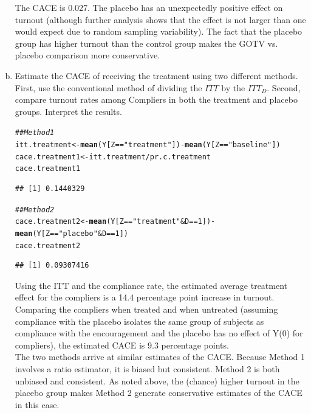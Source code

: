 \documentclass[11pt,notitlepage]{article}\usepackage[]{graphicx}\usepackage[]{color}
\makeatletter
\newcommand{\hlnum}[1]{\textcolor[rgb]{0.686,0.059,0.569}{#1}}%
\newcommand{\hlstr}[1]{\textcolor[rgb]{0.192,0.494,0.8}{#1}}%
\newcommand{\hlcom}[1]{\textcolor[rgb]{0.678,0.584,0.686}{\textit{#1}}}%
\newcommand{\hlopt}[1]{\textcolor[rgb]{0,0,0}{#1}}%
\newcommand{\hlstd}[1]{\textcolor[rgb]{0.345,0.345,0.345}{#1}}%
\newcommand{\hlkwb}[1]{\textcolor[rgb]{0.69,0.353,0.396}{#1}}%
\newcommand{\hlkwd}[1]{\textcolor[rgb]{0.737,0.353,0.396}{\textbf{#1}}}%
\newenvironment{kframe}{%
 \def\at@end@of@kframe{}%
 \ifinner\ifhmode%
  \def\at@end@of@kframe{\end{minipage}}%
  \begin{minipage}{\columnwidth}%
 \fi\fi%
 \def\FrameCommand##1{\hskip\@totalleftmargin \hskip-\fboxsep
 \colorbox{shadecolor}{##1}\hskip-\fboxsep
     \hskip-\linewidth \hskip-\@totalleftmargin \hskip\columnwidth}%
 \MakeFramed {\advance\hsize-\width
   \@totalleftmargin\z@ \linewidth\hsize
   \@setminipage}}%
 {\par\unskip\endMakeFramed%
 \at@end@of@kframe}
\newenvironment{knitrout}{}{} %
\makeatother
\begin{document}
\begin{enumerate}[a)]
The CACE is 0.027. The placebo has an unexpectedly positive effect on turnout (although further analysis shows that the effect is not larger than one would expect due to random sampling variability). The fact that the placebo group has higher turnout than the control group makes the GOTV vs. placebo comparison more conservative.

\item Estimate the CACE of receiving the treatment using two different methods. First, use the conventional method of dividing the $ITT$ by the $ITT_D$. Second, compare turnout rates among Compliers in both the treatment and placebo groups. Interpret the results. \\
\begin{knitrout}
\color{fgcolor}\begin{kframe}
\begin{alltt}
\hlcom{## Method 1}
\hlstd{itt.treatment} \hlkwb{<-} \hlkwd{mean}\hlstd{(Y[Z}\hlopt{==}\hlstr{"treatment"}\hlstd{])} \hlopt{-} \hlkwd{mean}\hlstd{(Y[Z}\hlopt{==}\hlstr{"baseline"}\hlstd{])}
\hlstd{cace.treatment1} \hlkwb{<-} \hlstd{itt.treatment}\hlopt{/}\hlstd{pr.c.treatment}
\hlstd{cace.treatment1}
\end{alltt}
\begin{verbatim}
## [1] 0.1440329
\end{verbatim}
\begin{alltt}
\hlcom{## Method 2}
\hlstd{cace.treatment2} \hlkwb{<-} \hlkwd{mean}\hlstd{(Y[Z}\hlopt{==}\hlstr{"treatment"} \hlopt{&} \hlstd{D}\hlopt{==}\hlnum{1}\hlstd{])} \hlopt{-} \hlkwd{mean}\hlstd{(Y[Z}\hlopt{==}\hlstr{"placebo"} \hlopt{&} \hlstd{D}\hlopt{==}\hlnum{1}\hlstd{])}
\hlstd{cace.treatment2}
\end{alltt}
\begin{verbatim}
## [1] 0.09307416
\end{verbatim}
\end{kframe}
\end{knitrout}

Using the ITT and the compliance rate, the estimated average treatment effect for the compliers is a 14.4 percentage point increase in turnout. Comparing the compliers when treated and when untreated (assuming compliance with the placebo isolates the same group of subjects as compliance with the encouragement and the placebo has no effect of Y(0) for compliers), the estimated CACE is 9.3 percentage points. \\

The two methods arrive at similar estimates of the CACE. Because Method 1 involves a ratio estimator, it is biased but consistent.  Method 2 is both unbiased and consistent.  As noted above, the (chance) higher turnout in the placebo group makes Method 2 generate conservative estimates of the CACE in this case.
\end{enumerate}
\end{document}
